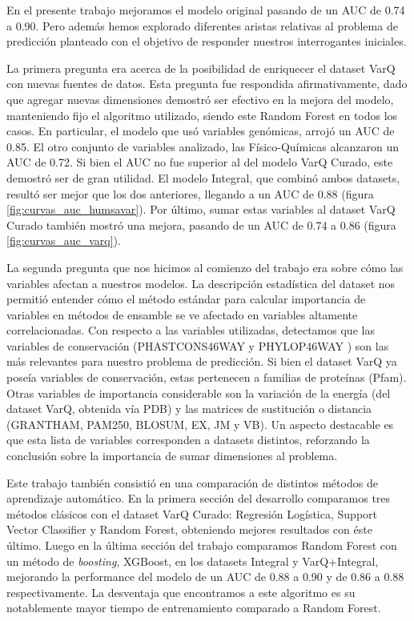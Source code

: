 En el presente trabajo mejoramos el modelo original pasando de un AUC de 0.74 a 0.90. Pero además hemos explorado diferentes aristas relativas al problema de predicción planteado con el objetivo de responder nuestros interrogantes iniciales. 

La primera pregunta era acerca de la posibilidad de enriquecer el dataset VarQ con nuevas fuentes de datos. Esta pregunta fue respondida afirmativamente, dado que agregar nuevas dimensiones demostró ser efectivo en la mejora del modelo, manteniendo fijo el algoritmo utilizado, siendo este Random Forest en todos los casos. En particular, el modelo que usó variables genómicas, arrojó un AUC de 0.85. El otro conjunto de variables analizado, las Físico-Químicas alcanzaron un AUC de 0.72. Si bien el AUC no fue superior al del modelo VarQ Curado, este demostró ser de gran utilidad. El modelo Integral, que combinó ambos datasets, resultó ser mejor que los dos anteriores, llegando a un AUC de 0.88 (figura \ref{fig:curvas_auc_humsavar}). Por último, sumar estas variables al dataset VarQ Curado también mostró una mejora, pasando de un AUC de 0.74 a 0.86 (figura \ref{fig:curvas_auc_varq}). 

La segunda pregunta que nos hicimos al comienzo del trabajo era sobre cómo las variables afectan a nuestros modelos. La descripción estadística del dataset nos permitió entender cómo el método estándar para calcular importancia de variables en métodos de ensamble se ve afectado en variables altamente correlacionadas. Con respecto a las variables utilizadas, detectamos que las variables de conservación (PHASTCONS46WAY \cite{siepel2005evolutionarily} y PHYLOP46WAY \cite{Pollard2010}) son las más relevantes para nuestro problema de predicción. Si bien el dataset VarQ ya poseía variables de conservación, estas pertenecen a familias de proteínas (Pfam). Otras variables de importancia considerable son la variación de la energía (del dataset VarQ, obtenida vía PDB) y las matrices de sustitución o distancia (GRANTHAM, PAM250, BLOSUM, EX, JM y VB). Un aspecto destacable es que esta lista de variables corresponden a datasets distintos, reforzando la conclusión sobre la importancia de sumar dimensiones al problema.

Este trabajo también consistió en una comparación de distintos métodos de aprendizaje automático. En la primera sección del desarrollo comparamos tres métodos clásicos con el dataset VarQ Curado: Regresión Logística, Support Vector Classifier y Random Forest, obteniendo mejores resultados con éste último. Luego en la última sección del trabajo comparamos Random Forest con un método de \textit{boosting}, XGBoost, en los datasets Integral y VarQ+Integral, mejorando la performance del modelo de un AUC de 0.88 a 0.90 y de 0.86 a 0.88 respectivamente. La desventaja que encontramos a este algoritmo es su notablemente mayor tiempo de entrenamiento comparado a Random Forest.

